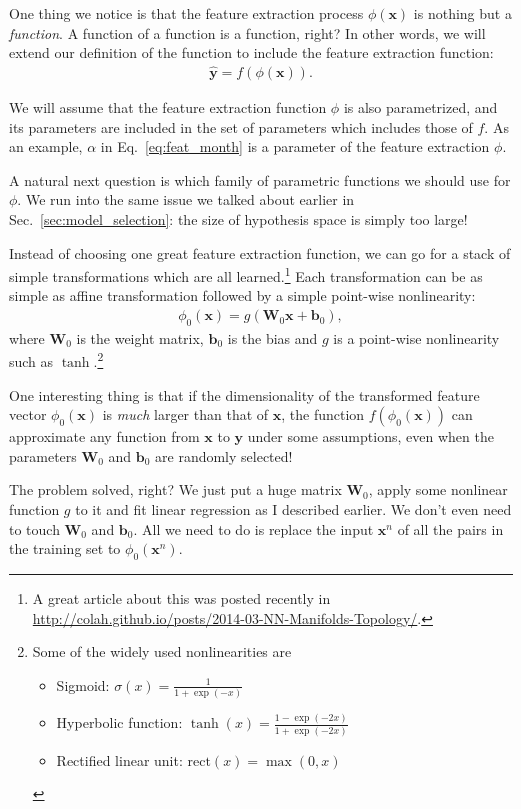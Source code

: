 \documentclass{report}
\newcommand{\vect}[1]{\mathbf{#1}}
\newcommand{\matr}[1]{\mathbf{#1}}
\newcommand{\vb}[0]{\vect{b}}
\newcommand{\vx}[0]{\vect{x}}
\newcommand{\vy}[0]{\vect{y}}
\newcommand{\mW}[0]{\matr{W}}
\newcommand{\rect}{\text{rect}}
\begin{document}
One thing we notice is that the feature extraction process $\phi(\vx)$ is
nothing but a {\em function}. A function of a function is a function, right? In
other words, we will extend our definition of the function to include the
feature extraction function:
\begin{align*}
    \hat{\vy} = f(\phi(\vx)).
\end{align*}

We will assume that the feature extraction function $\phi$ is also parametrized,
and its parameters are included in the set of parameters which includes those of
$f$. As an example, $\alpha$ in Eq.~\eqref{eq:feat_month} is a parameter of the
feature extraction $\phi$.

A natural next question is which family of parametric functions we should use
for $\phi$. We run into the same issue we talked about earlier in
Sec.~\ref{sec:model_selection}: the size of hypothesis space is simply too
large!

Instead of choosing one great feature extraction function, we can go for a stack
of simple transformations which are all learned.\footnote{
    A great article about this was posted recently in
    \url{http://colah.github.io/posts/2014-03-NN-Manifolds-Topology/}.
}
Each transformation can be as simple as affine transformation followed by a
simple point-wise nonlinearity:
\begin{align}
    \label{eq:layer}
    \phi_0(\vx) = g(\mW_0 \vx + \vb_0),
\end{align}
where $\mW_0$ is the weight matrix, $\vb_0$ is the bias and $g$ is a point-wise
nonlinearity such as $\tanh$.\footnote{
    Some of the widely used nonlinearities are
    \begin{itemize}
        \item Sigmoid: $\sigma(x) = \frac{1}{1+\exp(-x)}$
        \item Hyperbolic function: $\tanh(x) = \frac{1-\exp(-2x)}{1+\exp(-2x)}$
        \item Rectified linear unit: $\rect(x) = \max(0, x)$
    \end{itemize}
}

One interesting thing is that if the dimensionality of the transformed feature
vector $\phi_0(\vx)$ is {\em much} larger than that of $\vx$, the function
$f(\phi_0(\vx))$ can approximate any function from $\vx$ to $\vy$ under some
assumptions, even when the parameters $\mW_0$ and $\vb_0$ are randomly
selected!~\cite{Cover1965} 

The problem solved, right? We just put a huge matrix $\mW_0$, apply some
nonlinear function $g$ to it and fit linear regression as I described earlier.
We don't even need to touch $\mW_0$ and $\vb_0$. All we need to do is replace
the input $\vx^n$ of all the pairs in the training set to $\phi_0(\vx^n)$.
\end{document}
